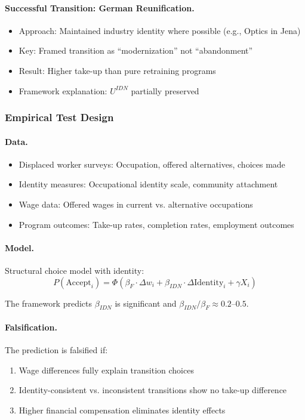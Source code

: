 \paragraph{Successful Transition: German Reunification.}
\begin{itemize}
  \item Approach: Maintained industry identity where possible (e.g., Optics in Jena)
  \item Key: Framed transition as ``modernization'' not ``abandonment''
  \item Result: Higher take-up than pure retraining programs
  \item Framework explanation: $U^{IDN}$ partially preserved
\end{itemize}

\subsubsection{Empirical Test Design}

\paragraph{Data.}
\begin{itemize}
  \item Displaced worker surveys: Occupation, offered alternatives, choices made
  \item Identity measures: Occupational identity scale, community attachment
  \item Wage data: Offered wages in current vs. alternative occupations
  \item Program outcomes: Take-up rates, completion rates, employment outcomes
\end{itemize}

\paragraph{Model.}
Structural choice model with identity:
\begin{equation}
P(\text{Accept}_i) = \Phi\left(\beta_F \cdot \Delta w_i + \beta_{IDN} \cdot \Delta \text{Identity}_i + \gamma X_i\right)
\end{equation}

The framework predicts $\beta_{IDN}$ is significant and $\beta_{IDN}/\beta_F \approx 0.2$--$0.5$.

\paragraph{Falsification.}
The prediction is falsified if:
\begin{enumerate}
  \item Wage differences fully explain transition choices
  \item Identity-consistent vs. inconsistent transitions show no take-up difference
  \item Higher financial compensation eliminates identity effects
\end{enumerate}

